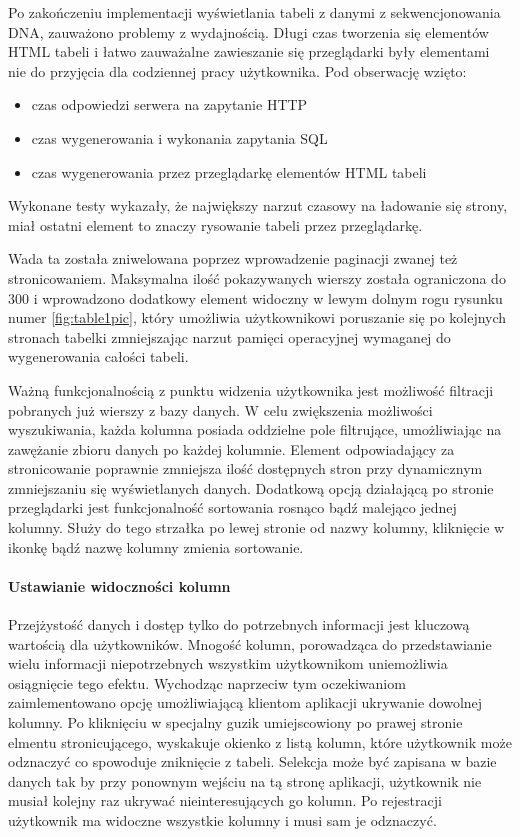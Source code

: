 \documentclass[a4paper,12pt,twoside]{article}
\begin{document}
Po zakończeniu implementacji wyświetlania tabeli z danymi z sekwencjonowania DNA,
zauważono problemy z wydajnością.
Długi czas tworzenia się elementów HTML tabeli i łatwo zauważalne zawieszanie się przeglądarki
były elementami nie do przyjęcia dla codziennej pracy użytkownika.
Pod obserwację wzięto:
\begin{itemize}
\item czas odpowiedzi serwera na zapytanie HTTP
\item czas wygenerowania i wykonania zapytania SQL
\item czas wygenerowania przez przeglądarkę elementów HTML tabeli
\end{itemize} 
Wykonane testy wykazały, że największy narzut czasowy na ładowanie się strony, miał ostatni 
element to znaczy rysowanie tabeli przez przeglądarkę. 

Wada ta została zniwelowana poprzez wprowadzenie paginacji zwanej też stronicowaniem.
Maksymalna ilość pokazywanych wierszy została ograniczona do 300 i wprowadzono dodatkowy 
element widoczny w lewym dolnym rogu rysunku numer \ref{fig:table1pic}, który umożliwia 
użytkownikowi poruszanie się po kolejnych stronach tabelki zmniejszając narzut 
pamięci operacyjnej wymaganej do wygenerowania całości tabeli.  


Ważną funkcjonalnością z punktu widzenia użytkownika jest możliwość filtracji pobranych już wierszy
z bazy danych. W celu zwiększenia możliwości wyszukiwania, każda kolumna posiada oddzielne pole 
filtrujące, umożliwiając na zawężanie zbioru danych po każdej kolumnie. Element odpowiadający
za stronicowanie poprawnie zmniejsza ilość dostępnych stron przy dynamicznym zmniejszaniu się
wyświetlanych danych.
Dodatkową opcją działającą po stronie przeglądarki jest 
funkcjonalność sortowania rosnąco bądź malejąco jednej kolumny. Służy do tego strzałka po
lewej stronie od nazwy kolumny, kliknięcie w ikonkę bądź nazwę kolumny zmienia sortowanie.

\newpage
\paragraph{Ustawianie widoczności kolumn}
Przejżystość danych i dostęp tylko do potrzebnych informacji jest kluczową wartością dla użytkowników.
Mnogość kolumn, porowadząca do przedstawianie wielu informacji niepotrzebnych 
wszystkim użytkownikom uniemożliwia osiągnięcie tego efektu. Wychodząc naprzeciw tym oczekiwaniom 
zaimlementowano opcję umożliwiającą klientom aplikacji ukrywanie dowolnej kolumny.
Po kliknięciu w specjalny guzik umiejscowiony po prawej stronie elmentu stronicującego, wyskakuje okienko z listą kolumn,
które użytkownik może odznaczyć co spowoduje zniknięcie z tabeli. Selekcja może być zapisana 
w bazie danych tak by przy ponownym wejściu na tą stronę aplikacji, użytkownik nie musiał
kolejny raz ukrywać nieinteresujących go kolumn. Po rejestracji użytkownik ma widoczne wszystkie
kolumny i musi sam je odznaczyć.
 
\end{document}

